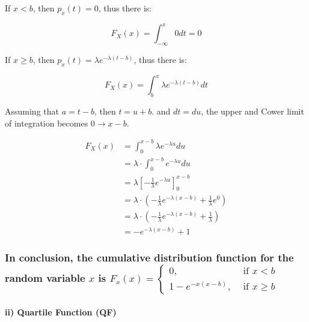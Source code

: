 \documentclass[
]{article}
\begin{document}
If \(x<b\), then \(p_{x}(t)=0\), thus there is:

\[
\begin{equation}
F_{X}(x)=\int_{-\infty}^{x} 0 d t=0 \tag{2}
\end{equation}
\]

If \(x \geqslant b\), then \(p_{x}(t)=\lambda e^{-\lambda(t-b)}\), thus
there is:

\[
\begin{equation}
F_{X}(x)=\int_{b}^{x} \lambda e^{-\lambda(t-b)} d t \tag{3}
\end{equation}
\]

Assuming that \(a=t-b\), then \(t=u+b\). and \(d t=d u\), the upper and
Cower limit of integration becomes \(0 \rightarrow x-b\).

\[
\begin{aligned}
F_{X}(x) & =\int_{0}^{x-b} \lambda e^{-\lambda u} d u \\
& =\lambda \cdot \int_{0}^{x-b} e^{-\lambda u} d u \\
& =\lambda\left[-\frac{1}{\lambda} e^{-\lambda u}\right]_{0}^{x-b} \\
& =\lambda \cdot\left(-\frac{1}{\lambda} e^{-\lambda(x-b)}+\frac{1}{\lambda} e^{0}\right) \\
& =\lambda \cdot\left(-\frac{1}{\lambda} e^{-\lambda(x-b)}+\frac{1}{\lambda}\right) \\
& =-e^{-\lambda(x-b)}+1 
\end{aligned}
\]

\subsubsection{\texorpdfstring{In conclusion, the cumulative
distribution function for the random variable \(x\) is
\(F_{x}(x)= \begin{cases}0, & \text { if } x<b \\ 1-e^{-x(x-b)}, & \text { if } x \geqslant b\end{cases}\)}{In conclusion, the cumulative distribution function for the random variable x is F\_\{x\}(x)= \textbackslash begin\{cases\}0, \& \textbackslash text \{ if \} x\textless b \textbackslash\textbackslash{} 1-e\^{}\{-x(x-b)\}, \& \textbackslash text \{ if \} x \textbackslash geqslant b\textbackslash end\{cases\}}}\label{in-conclusion-the-cumulative-distribution-function-for-the-random-variable-x-is-f_xx-begincases0-text-if-xb-1-e-xx-b-text-if-x-geqslant-bendcases}

\paragraph{ii) Quartile Function (QF)}\label{ii-quartile-function-qf}
\end{document}
